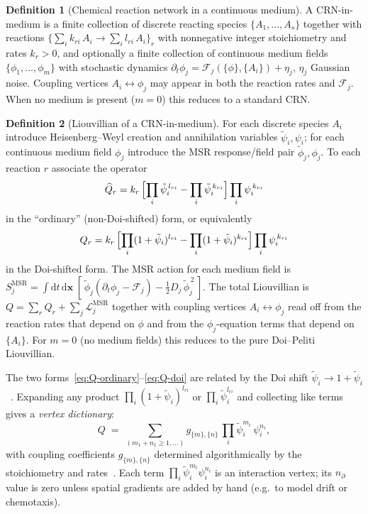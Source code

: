 \documentclass[11pt,a4paper]{article}
\newcommand{\dd}{\mathrm{d}}
\newcommand{\psit}{\tilde\psi}
\newcommand{\phit}{\tilde\phi}
\theoremstyle{plain}
\theoremstyle{definition}
\newtheorem{definition}{Definition}
\begin{document}
\begin{definition}[Chemical reaction network in a continuous medium]
A CRN-in-medium is a finite collection of discrete reacting
species $\{A_1, \ldots, A_s\}$ together with reactions
$\bigl\{\sum_i k_{r i}\,A_i \to \sum_i l_{r i}\,A_i\bigr\}_{r}$
with nonnegative integer stoichiometry and rates $k_r > 0$, and
optionally a finite collection of continuous medium fields
$\{\phi_1, \ldots, \phi_m\}$ with stochastic dynamics
$\partial_t \phi_j = \mathcal F_j(\{\phi\}, \{A_i\}) + \eta_j$,
$\eta_j$ Gaussian noise.  Coupling vertices
$A_i \longleftrightarrow \phi_j$ may appear in both the reaction
rates and $\mathcal F_j$.  When no medium is present ($m = 0$)
this reduces to a standard CRN.
\end{definition}

\begin{definition}[Liouvillian of a CRN-in-medium]
For each discrete species $A_i$ introduce Heisenberg--Weyl
creation and annihilation variables $\psit_i, \psi_i$; for each
continuous medium field $\phi_j$ introduce the MSR
response/field pair $\phit_j, \phi_j$.  To each reaction $r$
associate the operator
\begin{equation}\label{eq:Q-ordinary}
  \widehat{Q}_r
  = k_r\,
  \Bigl[\prod_i \psit_i^{\,l_{r i}}
    - \prod_i \psit_i^{\,k_{r i}}\Bigr]
  \prod_i \psi_i^{\,k_{r i}}
\end{equation}
in the ``ordinary'' (non-Doi-shifted) form, or equivalently
\begin{equation}\label{eq:Q-doi}
  Q_r
  = k_r\,
  \Bigl[\prod_i (1 + \psit_i)^{l_{r i}}
    - \prod_i (1 + \psit_i)^{k_{r i}}\Bigr]
  \prod_i \psi_i^{\,k_{r i}}
\end{equation}
in the Doi-shifted form.  The MSR action for each medium field is
$S^{\mathrm{MSR}}_j
= \int \dd t\,\dd \mathbf x\;[\,\phit_j(\partial_t \phi_j
- \mathcal F_j) - \tfrac12 D_j\,\phit_j^{\,2}\,]$.
The total Liouvillian is
$Q = \sum_r Q_r + \sum_j \mathcal L_j^{\mathrm{MSR}}$
together with coupling vertices $A_i \leftrightarrow \phi_j$
read off from the reaction rates that depend on $\phi$ and from
the $\phi_j$-equation terms that depend on $\{A_i\}$.  For
$m = 0$ (no medium fields) this reduces to the pure Doi--Peliti
Liouvillian.
\end{definition}

The two forms~\eqref{eq:Q-ordinary}--\eqref{eq:Q-doi} are related
by the Doi shift $\psit_i \to 1 + \psit_i$~\citep{Doi1976,Peliti1985,Tauber}.
Expanding any product $\prod_i (1+\psit_i)^{l_{ri}}$ or
$\prod_i \psit_i^{l_{ri}}$ and collecting like terms gives a
\emph{vertex dictionary}:
\begin{equation}\label{eq:vertex-dict}
  Q \;=\; \sum_{(m_1 + n_1 \geq 1,\ldots)}
    g_{\{m\},\{n\}}\,
    \prod_i \psit_i^{m_i}\,\psi_i^{n_i},
\end{equation}
with coupling coefficients $g_{\{m\},\{n\}}$ determined
algorithmically by the stoichiometry and rates~\citep{Amarteifio2019Thesis}.
Each term $\prod_i \psit_i^{m_i}\psi_i^{n_i}$ is an interaction
vertex; its $n_\partial$ value is zero unless spatial gradients
are added by hand (e.g.\ to model drift or chemotaxis).
\end{document}
